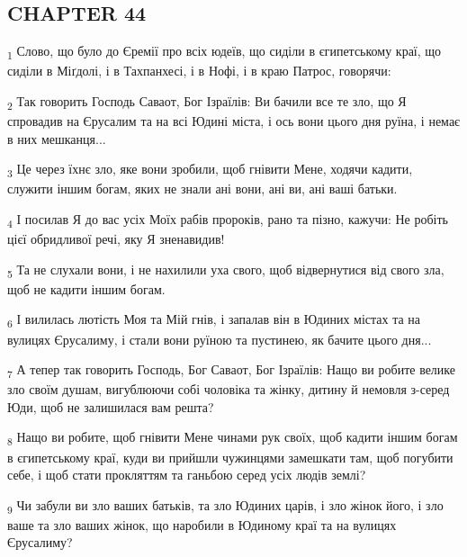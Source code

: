 \subsection{CHAPTER 44}
\begin{tcolorbox}
\textsubscript{1} Слово, що було до Єремії про всіх юдеїв, що сиділи в єгипетському краї, що сиділи в Міґдолі, і в Тахпанхесі, і в Нофі, і в краю Патрос, говорячи:
\end{tcolorbox}
\begin{tcolorbox}
\textsubscript{2} Так говорить Господь Саваот, Бог Ізраїлів: Ви бачили все те зло, що Я спровадив на Єрусалим та на всі Юдині міста, і ось вони цього дня руїна, і немає в них мешканця...
\end{tcolorbox}
\begin{tcolorbox}
\textsubscript{3} Це через їхнє зло, яке вони зробили, щоб гнівити Мене, ходячи кадити, служити іншим богам, яких не знали ані вони, ані ви, ані ваші батьки.
\end{tcolorbox}
\begin{tcolorbox}
\textsubscript{4} І посилав Я до вас усіх Моїх рабів пророків, рано та пізно, кажучи: Не робіть цієї обридливої речі, яку Я зненавидив!
\end{tcolorbox}
\begin{tcolorbox}
\textsubscript{5} Та не слухали вони, і не нахилили уха свого, щоб відвернутися від свого зла, щоб не кадити іншим богам.
\end{tcolorbox}
\begin{tcolorbox}
\textsubscript{6} І вилилась лютість Моя та Мій гнів, і запалав він в Юдиних містах та на вулицях Єрусалиму, і стали вони руїною та пустинею, як бачите цього дня...
\end{tcolorbox}
\begin{tcolorbox}
\textsubscript{7} А тепер так говорить Господь, Бог Саваот, Бог Ізраїлів: Нащо ви робите велике зло своїм душам, вигублюючи собі чоловіка та жінку, дитину й немовля з-серед Юди, щоб не залишилася вам решта?
\end{tcolorbox}
\begin{tcolorbox}
\textsubscript{8} Нащо ви робите, щоб гнівити Мене чинами рук своїх, щоб кадити іншим богам в єгипетському краї, куди ви прийшли чужинцями замешкати там, щоб погубити себе, і щоб стати прокляттям та ганьбою серед усіх людів землі?
\end{tcolorbox}
\begin{tcolorbox}
\textsubscript{9} Чи забули ви зло ваших батьків, та зло Юдиних царів, і зло жінок його, і зло ваше та зло ваших жінок, що наробили в Юдиному краї та на вулицях Єрусалиму?
\end{tcolorbox}
